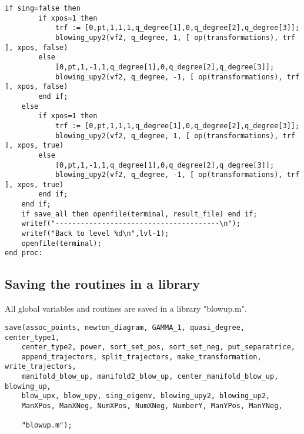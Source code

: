 \documentclass[a4paper,10pt]{article}
\begin{document}
\begin{lstlisting}[name=blowup]
    if sing=false then
        if xpos=1 then
            trf := [0,pt,1,1,1,q_degree[1],0,q_degree[2],q_degree[3]];
            blowing_upy2(vf2, q_degree, 1, [ op(transformations), trf ], xpos, false)
        else
            [0,pt,1,-1,1,q_degree[1],0,q_degree[2],q_degree[3]];
            blowing_upy2(vf2, q_degree, -1, [ op(transformations), trf ], xpos, false)
        end if;
    else
        if xpos=1 then
            trf := [0,pt,1,1,1,q_degree[1],0,q_degree[2],q_degree[3]];
            blowing_upy2(vf2, q_degree, 1, [ op(transformations), trf ], xpos, true)
        else
            [0,pt,1,-1,1,q_degree[1],0,q_degree[2],q_degree[3]];
            blowing_upy2(vf2, q_degree, -1, [ op(transformations), trf ], xpos, true)
        end if;
    end if;
    if save_all then openfile(terminal, result_file) end if;
    writef("---------------------------------------\n");
    writef("Back to level %d\n",lvl-1);
    openfile(terminal);
end proc:
\end{lstlisting}

\subsection{Saving the routines in a library}

All global variables and routines are saved in a library "blowup.m".

\begin{lstlisting}[name=blowup]
save(assoc_points, newton_diagram, GAMMA_1, quasi_degree, center_type1,
    center_type2, power, sort_set_pos, sort_set_neg, put_separatrice,
    append_trajectors, split_trajectors, make_transformation, write_trajectors,
    manifold_blow_up, manifold2_blow_up, center_manifold_blow_up, blowing_up,
    blow_upx, blow_upy, sing_eigenv, blowing_upy2, blowing_up2,
    ManXPos, ManXNeg, NumXPos, NumXNeg, NumberY, ManYPos, ManYNeg,

    "blowup.m");
\end{lstlisting}
\end{document}
